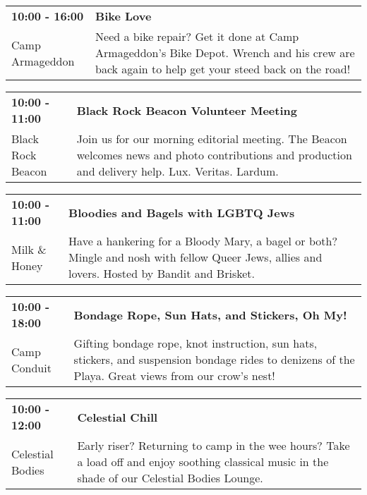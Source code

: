 \begin{tabular}{ p{1in} p{2.2in} }
    \textbf{10:00 - 16:00} & \textbf{Bike Love} \\
    Camp Armageddon \newline  & Need a bike repair? Get it done at Camp Armageddon's Bike Depot. Wrench and his crew are back again to help get your steed back on the road! \\
    \hline 
\end{tabular}
    
\begin{tabular}{ p{1in} p{2.2in} }
    \textbf{10:00 - 11:00} & \textbf{Black Rock Beacon Volunteer Meeting} \\
    Black Rock Beacon \newline  & Join us for our morning editorial meeting. The Beacon welcomes news and photo contributions and production and delivery help. Lux. Veritas. Lardum. \\
    \hline 
\end{tabular}
    
\begin{tabular}{ p{1in} p{2.2in} }
    \textbf{10:00 - 11:00} & \textbf{Bloodies and Bagels with LGBTQ Jews} \\
    Milk \& Honey \newline  & Have a hankering for a Bloody Mary, a bagel or both?  Mingle and nosh with fellow Queer Jews, allies and lovers. Hosted by Bandit and Brisket. \\
    \hline 
\end{tabular}
    
\begin{tabular}{ p{1in} p{2.2in} }
    \textbf{10:00 - 18:00} & \textbf{Bondage Rope, Sun Hats, and Stickers, Oh My!} \\
    Camp Conduit \newline  & Gifting bondage rope, knot instruction, sun hats, stickers, and suspension bondage rides to denizens of the Playa. Great views from our crow's nest! \\
    \hline 
\end{tabular}
    
\begin{tabular}{ p{1in} p{2.2in} }
    \textbf{10:00 - 12:00} & \textbf{Celestial Chill} \\
    Celestial Bodies \newline  & Early riser? Returning to camp in the wee hours? Take a load off and enjoy soothing classical music in the shade of our Celestial Bodies Lounge. \\
    \hline 
\end{tabular}
    
